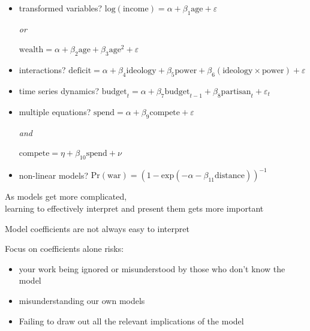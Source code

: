 \documentclass[pdflatex,landscape,titlepage]{foils}
\begin{document}
\begin{itemize}
\item transformed variables?  \quad 
   $\mathrm{log}(\mathrm{income}) = \alpha +
  \beta_1\mathrm{age} + \varepsilon$  

\quad \quad \quad \quad \quad  \quad \quad 
 \quad \quad \quad \quad \quad \quad \quad \quad \emph{or} 

 \quad \quad \quad \quad \quad  \quad \quad 
 \quad \quad \quad \quad $\mathrm{wealth} = \alpha + \beta_2\mathrm{age}+ \beta_3\mathrm{age}^2 + \varepsilon$
  

\item interactions?  \quad  
  $\mathrm{deficit} = \alpha + \beta_4\mathrm{ideology} + \beta_5\mathrm{power} + \beta_6(\mathrm{ideology} \times
  \mathrm{power}) + \varepsilon$   

\item time series dynamics?  \quad  
  $\mathrm{budget}_{t} = \alpha + \beta_7\mathrm{budget}_{t-1} +
  \beta_8\mathrm{partisan}_t + \varepsilon_t$   

\item multiple equations?  \quad   $\mathrm{spend} =
  \alpha + \beta_9\mathrm{compete} + \varepsilon$ \quad 

\quad \quad \quad \quad \quad  \quad \quad 
 \quad \quad \quad \quad \quad \quad \quad \quad\emph{and}
 
\quad \quad
  \quad \quad \quad  \quad \quad 
  \quad \quad 
  \quad $\mathrm{compete} = \eta + 
  \beta_{10}\mathrm{spend} + \nu$   

\item non-linear models?  \quad   $\mathrm{Pr(war)}
  = (1 - \mathrm{exp}(-\alpha -\beta_{11}\mathrm{distance}))^{-1}$
   
\end{itemize}

\bgclear

As models get more complicated, \\
learning to effectively interpret and present them gets more important

Model coefficients are not always easy to interpret

Focus on coefficients alone risks:

\begin{itemize}
\item your work being ignored or misunderstood by those who don't know the model

\item misunderstanding our own models

\item Failing to draw out all the relevant implications of the model
\end{itemize}
\end{document}
